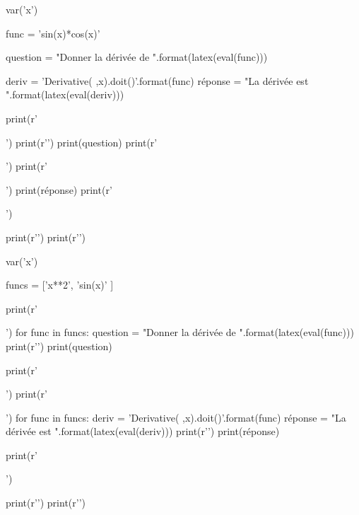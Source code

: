\documentclass[12pt,french]{article}
\author{Vincent-Xavier Jumel}
\begin{document}
\begin{sympyblock}
  var('x')

  func = 'sin(x)*cos(x)'

  question = "Donner la dérivée de ${}$".format(latex(eval(func)))

  deriv = 'Derivative({} ,x).doit()'.format(func)
  réponse = "La dérivée est ${}$".format(latex(eval(deriv)))

  print(r'\begin{Exercise}')
  print(r'\Question')
  print(question)
  print(r'\end{Exercise}')
  print(r'\begin{Answer}')
  print(réponse)
  print(r'\end{Answer}')

  print(r'\pagebreak')
  print(r'\shipoutAnswer')
\end{sympyblock}
\printpythontex
\pagebreak

\begin{sympycode}
  var('x')

  funcs = ['x**2', 'sin(x)' ]

  print(r'\begin{Exercise}')
  for func in funcs:
      question = "Donner la dérivée de ${}$".format(latex(eval(func)))
      print(r'\Question')
      print(question)

  print(r'\end{Exercise}')
  print(r'\begin{Answer}')
  for func in funcs:
      deriv = 'Derivative({} ,x).doit()'.format(func)
      réponse = "La dérivée est ${}$".format(latex(eval(deriv)))
      print(r'\Question')
      print(réponse)

  print(r'\end{Answer}')

  print(r'\pagebreak')
  print(r'\shipoutAnswer')
\end{sympycode}
\end{document}
